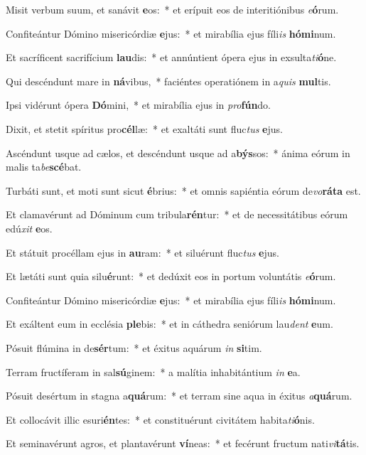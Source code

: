\item Misit verbum suum, et sanávit \textbf{e}os:~* et erípuit eos de interitiónibus \textit{e}\textbf{ó}rum.
\item Confiteántur Dómino misericórdiæ \textbf{e}jus:~* et mirabília ejus fíli\textit{is} \textbf{hó}\textbf{mi}num.
\item Et sacríficent sacrifícium \textbf{lau}dis:~* et annúntient ópera ejus in exsulta\textit{ti}\textbf{ó}ne.
\item Qui descéndunt mare in \textbf{ná}vibus,~* faciéntes operatiónem in a\textit{quis} \textbf{mul}tis.
\item Ipsi vidérunt ópera \textbf{Dó}mini,~* et mirabília ejus in \textit{pro}\textbf{fún}do.
\item Dixit, et stetit spíritus pro\textbf{cél}læ:~* et exaltáti sunt fluc\textit{tus} \textbf{e}jus.
\item Ascéndunt usque ad cælos, et descéndunt usque ad a\textbf{býs}sos:~* ánima eórum in malis ta\textit{be}\textbf{scé}bat.
\item Turbáti sunt, et moti sunt sicut \textbf{é}brius:~* et omnis sapiéntia eórum de\textit{vo}\textbf{rá}\textbf{ta} est.
\item Et clamavérunt ad Dóminum cum tribula\textbf{rén}tur:~* et de necessitátibus eórum edú\textit{xit} \textbf{e}os.
\item Et státuit procéllam ejus in \textbf{au}ram:~* et siluérunt fluc\textit{tus} \textbf{e}jus.
\item Et lætáti sunt quia silu\textbf{é}runt:~* et dedúxit eos in portum voluntátis \textit{e}\textbf{ó}rum.
\item Confiteántur Dómino misericórdiæ \textbf{e}jus:~* et mirabília ejus fíli\textit{is} \textbf{hó}\textbf{mi}num.
\item Et exáltent eum in ecclésia \textbf{ple}bis:~* et in cáthedra seniórum lau\textit{dent} \textbf{e}um.
\item Pósuit flúmina in de\textbf{sér}tum:~* et éxitus aquárum \textit{in} \textbf{si}tim.
\item Terram fructíferam in sal\textbf{sú}ginem:~* a malítia inhabitántium \textit{in} \textbf{e}a.
\item Pósuit desértum in stagna a\textbf{quá}rum:~* et terram sine aqua in éxitus \textit{a}\textbf{quá}rum.
\item Et collocávit illic esuri\textbf{én}tes:~* et constituérunt civitátem habita\textit{ti}\textbf{ó}nis.
\item Et seminavérunt agros, et plantavérunt \textbf{ví}neas:~* et fecérunt fructum nati\textit{vi}\textbf{tá}tis.
